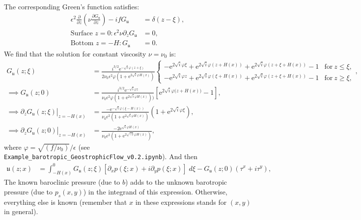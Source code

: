 \documentclass[10pt]{amsart}
\begin{document}
The corresponding Green's function satisfies:
\begin{align}
\epsilon^2 \frac{\partial}{\partial z} \left( \nu  \frac{\partial G_\mathfrak{u}}{\partial z} \right)  - i f  G_\mathfrak{u} & = \delta(z - \xi) ,  \\
\text{Surface~}z = 0:
\epsilon^2 \nu \partial_z G_\mathfrak{u} & = 0 ,
 \\
\text{Bottom~}z = -H:
G_\mathfrak{u} & = 0 .
\end{align}
We find that the solution for constant viscosity $\nu = \nu_0$ is:  
\begin{align}
 G_{ \mathfrak{u}}(z;\xi) & = 
\frac{ i^{3/2} \mathrm{e}^{- \sqrt{i} \varphi (z + \xi)} }{2  \nu_0 \epsilon^2 \varphi  \left(1 + \mathrm{e}^{2 \sqrt{i} \varphi H \left(x \right)} \right)}
\begin{cases} 
\displaystyle - \mathrm{e}^{2 \sqrt{i} \varphi \xi} + \mathrm{e}^{2 \sqrt{i} \varphi \left( z + H(x)\right)} + \mathrm{e}^{2 \sqrt{i} \varphi \left( z + \xi + H(x)\right)} - 1
 & \text{for}\: z \leq \xi , \\
\displaystyle - \mathrm{e}^{2 \sqrt{i} \varphi z} + \mathrm{e}^{2 \sqrt{i} \varphi \left( \xi + H(x)\right)} + \mathrm{e}^{2 \sqrt{i} \varphi \left( z + \xi + H(x)\right)} - 1
 & \text{for}\: z \geq \xi ,
\end{cases} , \label{eqn:FG_Gsfn} \\
\implies  G_{ \mathfrak{u}}(z;0) & = 
\frac{ i^{3/2} \mathrm{e}^{- \sqrt{i} \varphi z } }{ \nu_0 \epsilon^2 \varphi  \left(1 + \mathrm{e}^{2 \sqrt{i} \varphi H \left(x \right)} \right))}
\left[ \mathrm{e}^{2 \sqrt{i} \varphi ( z  + H{\left(x \right))}} - 1 \right] , \nonumber \\
\implies \partial_z \left. G_{ \mathfrak{u}}(z;\xi) \right|_{z = -H(x)} & = 
\frac{- \mathrm{e}^{-\sqrt{i} \varphi (\xi - H(x))  } }{ \nu_0 \epsilon^2 \left(1 + \mathrm{e}^{2 \sqrt{i} \varphi H \left(x \right)} \right)}
\left( 1 + \mathrm{e}^{2 \sqrt{i} \varphi \xi}\right) , \label{eqn:FG_Gsfn_bottom_deriv} \\
\implies \partial_z \left. G_{ \mathfrak{u}}(z;0) \right|_{z = -H(x)} & = 
\frac{- 2 \mathrm{e}^{\sqrt{i} \varphi H(x)  } }{ \nu_0 \epsilon^2 \left(1 + \mathrm{e}^{2 \sqrt{-i} \varphi H \left(x \right)} \right)}
 , \label{eqn:FG_Gsfn_bottom_deriv_top}
\end{align}
where $\varphi = \sqrt{\left( f / \nu_0 \right) } / \epsilon$ (see \texttt{Example\_barotropic\_GeostrophicFlow\_v0.2.ipynb}).
And then 
\begin{align}
\mathfrak{u} (z;x) & = \int_{-H(x)}^{0} G_{ \mathfrak{u}} (z; \xi) \left[ \partial_x p( \xi; x) + i \partial_y p( \xi; x) \right] \; d \xi 
 -   G_{\mathfrak{u}} (z; 0)  \left( \tau^x + i \tau^y \right)  ,
\end{align}
The known baroclinic pressure (due to $b$) adds to the unknown barotropic pressure (due to $p_s(x,y)$) in the integrand of this expression. 
Otherwise, everything else is known (remember that $x$ in these expressions stands for $(x,y)$ in general).
\end{document}
